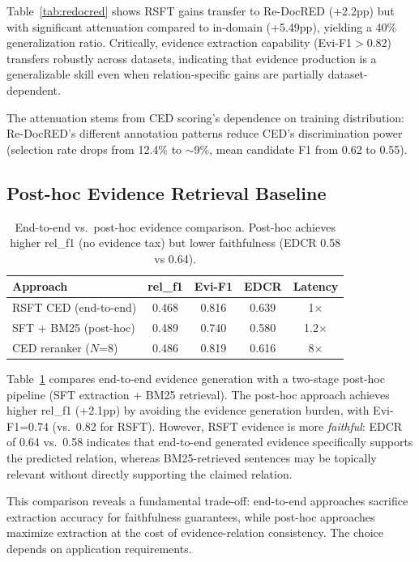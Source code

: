 \documentclass[11pt,a4paper]{article}
\begin{document}
Table~\ref{tab:redocred} shows RSFT gains transfer to Re-DocRED (+2.2pp) but with significant attenuation compared to in-domain (+5.49pp), yielding a 40\% generalization ratio. Critically, evidence extraction capability (Evi-F1$>$0.82) transfers robustly across datasets, indicating that evidence production is a generalizable skill even when relation-specific gains are partially dataset-dependent.

The attenuation stems from CED scoring's dependence on training distribution: Re-DocRED's different annotation patterns reduce CED's discrimination power (selection rate drops from 12.4\% to $\sim$9\%, mean candidate F1 from 0.62 to 0.55).

\subsection{Post-hoc Evidence Retrieval Baseline}

\begin{table}[t]
\centering
\small
\begin{tabular}{lcccc}
\toprule
\textbf{Approach} & \textbf{rel\_f1} & \textbf{Evi-F1} & \textbf{EDCR} & \textbf{Latency} \\
\midrule
RSFT CED (end-to-end) & 0.468 & 0.816 & 0.639 & 1$\times$ \\
SFT + BM25 (post-hoc) & 0.489 & 0.740 & 0.580 & 1.2$\times$ \\
CED reranker ($N$=8) & 0.486 & 0.819 & 0.616 & 8$\times$ \\
\bottomrule
\end{tabular}
\caption{End-to-end vs.\ post-hoc evidence comparison. Post-hoc achieves higher rel\_f1 (no evidence tax) but lower faithfulness (EDCR 0.58 vs 0.64).}
\label{tab:posthoc}
\end{table}

Table~\ref{tab:posthoc} compares end-to-end evidence generation with a two-stage post-hoc pipeline (SFT extraction + BM25 retrieval). The post-hoc approach achieves higher rel\_f1 (+2.1pp) by avoiding the evidence generation burden, with Evi-F1=0.74 (vs.\ 0.82 for RSFT). However, RSFT evidence is more \emph{faithful}: EDCR of 0.64 vs.\ 0.58 indicates that end-to-end generated evidence specifically supports the predicted relation, whereas BM25-retrieved sentences may be topically relevant without directly supporting the claimed relation.

This comparison reveals a fundamental trade-off: end-to-end approaches sacrifice extraction accuracy for faithfulness guarantees, while post-hoc approaches maximize extraction at the cost of evidence-relation consistency. The choice depends on application requirements.
\end{document}
